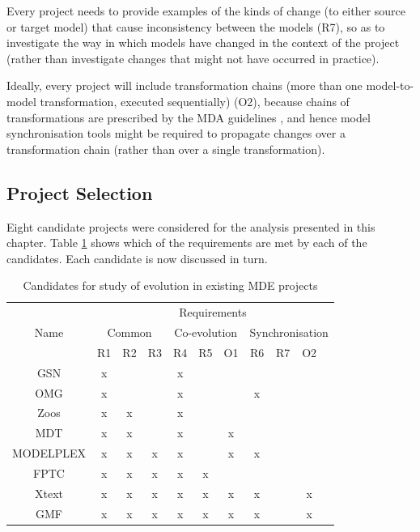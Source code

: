 Every project needs to provide examples of the kinds of change (to either source or target model) that cause inconsistency between the models (R7), so as to investigate the way in which models have changed in the context of the project (rather than investigate changes that might not have occurred in practice). 

Ideally, every project will include transformation chains (more than one model-to-model transformation, executed sequentially) (O2), because chains of transformations are prescribed by the MDA guidelines \cite{kleppe03mda}, and hence model synchronisation tools might be required to propagate changes over a transformation chain (rather than over a single transformation).


\subsection{Project Selection}
\label{subsec:project_selection}
Eight candidate projects were considered for the analysis presented in this chapter. Table \ref{tab:candidates} shows which of the requirements are met by each of the candidates. Each candidate is now discussed in turn.

\begin{table}
	\centering
	\begin{tabular}{|c||c|c|c||c|c|c||c|c|c|c|}
		\hline
		\multirow{3}{*}{Name} & \multicolumn{10}{|c|}{Requirements} \\
		\cline{2-11}
		          & \multicolumn{3}{|c||}{Common} & \multicolumn{3}{|c||}{Co-evolution} & \multicolumn{4}{|c|}{Synchronisation} \\
		\cline{2-11}
		          & R1 & R2 & R3 & R4 & R5 & O1 & R6 & R7 & O2 \\
		\hline                                         
		GSN       & x  &    &    & x  &    &    &    &    &    \\
		\hline                                         
		OMG       & x  &    &    & x  &    &    & x  &    &    \\
		\hline                                         
		Zoos      & x  & x  &    & x  &    &    &    &    &    \\
		\hline                                         
		MDT       & x  & x  &    & x  &    & x  &    &    &    \\
		\hline                                         
		MODELPLEX & x  & x  & x  & x  &    & x  & x  &    &    \\
		\hline                                         
		FPTC      & x  & x  & x  & x  & x  &    &    &    &    \\
		\hline                                         
		Xtext     & x  & x  & x  & x  & x  & x  & x  &    & x  \\
		\hline                                         
		GMF       & x  & x  & x  & x  & x  & x  & x  &    & x  \\
		\hline
	\end{tabular}
	\label{tab:candidates}
	\caption{Candidates for study of evolution in existing MDE projects}
\end{table}

